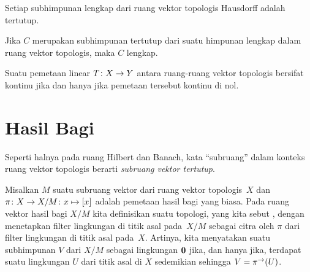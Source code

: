 \begin{prop} Setiap subhimpunan lengkap dari ruang vektor topologis Hausdorff adalah tertutup.
\end{prop}

\begin{prop} Jika $C$ merupakan subhimpunan tertutup dari suatu himpunan lengkap dalam ruang vektor topologis, maka $C$ lengkap.
\end{prop}



\begin{prop} Suatu pemetaan linear $T\colon X \rightarrow Y$ antara ruang-ruang vektor topologis bersifat kontinu jika dan hanya jika pemetaan tersebut kontinu di nol.
\end{prop}



















\section{Hasil Bagi}

\begin{conv} Seperti halnya pada ruang Hilbert dan Banach, kata ``subruang'' dalam konteks ruang vektor topologis
berarti \emph{subruang vektor tertutup}.
\end{conv}

\begin{defn} Misalkan $M$ suatu subruang vektor dari ruang vektor topologis~$X$ dan $\pi\colon X \rightarrow X/M \colon x \mapsto [x]$
adalah pemetaan hasil bagi yang biasa. Pada ruang vektor hasil bagi $X/M$ kita definisikan suatu topologi, yang kita sebut
, dengan menetapkan filter lingkungan di titik asal pada~$X/M$ sebagai citra oleh $\pi$ dari
filter lingkungan di titik asal pada~$X$. Artinya, kita menyatakan suatu subhimpunan $V$ dari $X/M$ sebagai lingkungan $\mathbf{0}$ jika,
dan hanya jika, terdapat suatu lingkungan $U$ dari titik asal di $X$ sedemikian sehingga $V = \pi^{\rightarrow}(U)$.
\end{defn}

